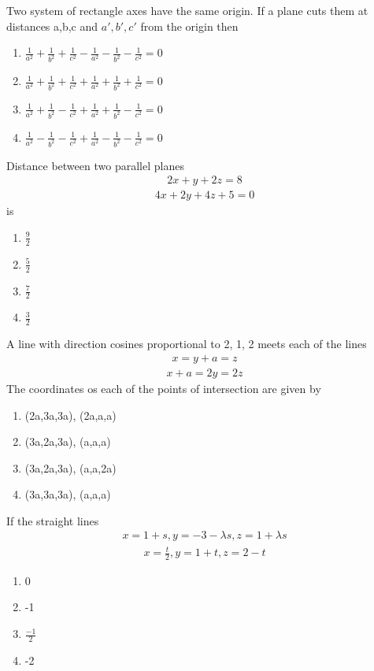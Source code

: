 \item Two system of rectangle axes have the same origin. If a plane cuts them at distances a,b,c and $a',b',c'$ from the origin then
\begin{enumerate}
\item $\frac{1}{a^2}+\frac{1}{b^2}+\frac{1}{c^2}-\frac{1}{a^2}-\frac{1}{b^2}-\frac{1}{c^2}=0$
\item $\frac{1}{a^2}+\frac{1}{b^2}+\frac{1}{c^2}+\frac{1}{a^2}+\frac{1}{b^2}+\frac{1}{c^2}=0$
\item $\frac{1}{a^2}+\frac{1}{b^2}-\frac{1}{c^2}+\frac{1}{a^2}+\frac{1}{b^2}-\frac{1}{c^2}=0$
\item $\frac{1}{a^2}-\frac{1}{b^2}-\frac{1}{c^2}+\frac{1}{a^2}-\frac{1}{b^2}-\frac{1}{c^2}=0$
\end{enumerate}

\item Distance between two parallel planes 
\begin{align}
2x+y+2z=8
\end{align}
\begin{align}
4x+2y+4z+5=0
\end{align}
is
\begin{enumerate}
\item $\frac{9}{2}$
\item $\frac{5}{2}$
\item $\frac{7}{2}$
\item $\frac{3}{2}$
\end{enumerate}

\item A line with direction cosines proportional to 2, 1, 2 meets each of the lines 
\begin{align}
x=y+a=z
\end{align}
\begin{align}
x+a=2y=2z
\end{align}
The coordinates os each of the points of intersection are given by
\begin{enumerate}
\item (2a,3a,3a), (2a,a,a)
\item (3a,2a,3a), (a,a,a)
\item (3a,2a,3a), (a,a,2a)
\item (3a,3a,3a), (a,a,a)
\end{enumerate}

\item If the straight lines
\begin{align}
x=1+s, y=-3-\lambda s, z=1+\lambda s
\end{align}
\begin{align}
x=\frac{t}{2}, y=1+t, z=2-t
\end{align}
\begin{enumerate}
\item 0
\item -1
\item $\frac{-1}{2}$
\item -2
\end{enumerate}


